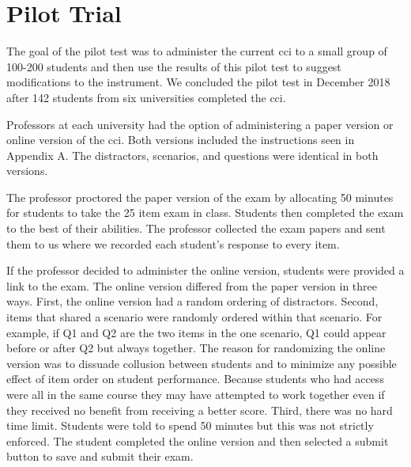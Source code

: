

\begin{table}[!ht]
\centering
\caption{Five Core Concepts of Cybersecurity}
\label{tab:topics}
\end{table}




\FloatBarrier






\section{Pilot Trial}

The goal of the pilot test was to administer the current \gls{cci} to a small group of 100-200 students and then use the results of this pilot test to suggest modifications to the instrument. We concluded the pilot test in December 2018 after 142 students from six universities completed the \gls{cci}.

Professors at each university had the option of administering a paper version or online version of the \gls{cci}. Both versions included the instructions seen in Appendix A. The distractors, scenarios, and questions were identical in both versions. 

The professor proctored the paper version of the exam by allocating 50 minutes for students to take the 25 item exam in class. Students then completed the exam to the best of their abilities. The professor collected the exam papers and sent them to us where we recorded each student's response to every item.  

If the professor decided to administer the online version, students were provided a link to the exam. The online version differed from the paper version in three ways. First, the online version had a random ordering of distractors. Second, items that shared a scenario were randomly ordered within that scenario. For example, if Q1 and Q2 are the two items in the one scenario, Q1 could appear before or after Q2 but always together. The reason for randomizing the online version was to dissuade collusion between students and to minimize any possible effect of item order on student performance. Because students who had access were all in the same course they may have attempted to work together even if they received no benefit from receiving a better score. Third, there was no hard time limit. Students were told to spend 50 minutes but this was not strictly enforced. The student completed the online version and then selected a submit button to save and submit their exam.


